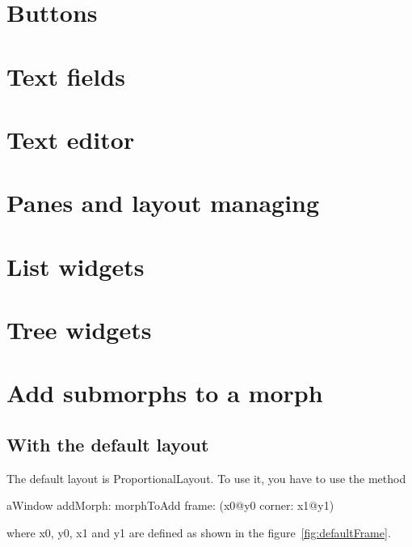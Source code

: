 \documentclass[a4paper,10pt,twoside]{book}
\begin{document}
\section{Buttons}

\section{Text fields}

\section{Text editor}

\section{Panes and layout managing}

\section{List widgets}

\section{Tree widgets}

\section{Add submorphs to a morph}


\subsection{With the default layout}

The default layout is ProportionalLayout. To use it, you have to use the method 
\begin{code}{}
aWindow
	addMorph: morphToAdd
	frame: (x0@y0 corner: x1@y1)
\end{code}
where x0, y0, x1 and y1 are defined as shown in the figure~\ref{fig:defaultFrame}.
\end{document}

